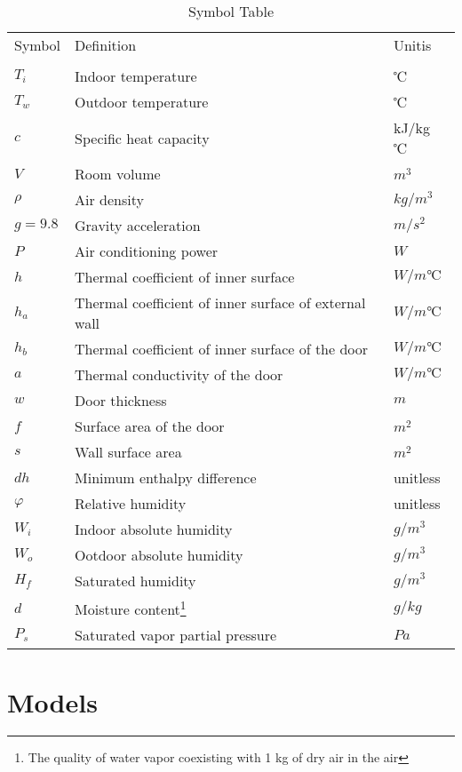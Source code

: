 \documentclass{mcmthesis}
\begin{document}
		\begin{table}
			\caption{Symbol Table}
			\centering
			\renewcommand\arraystretch{1.32}
			\begin{tabular}{l p{10cm} l}
				\hline
				Symbol & Definition & Unitis\\
				\noalign{\global\arrayrulewidth1pt}\hline\noalign{\global\arrayrulewidth0.9pt}
				\multicolumn{3}{c}{\textbf{Fundamental}}\\
				$T_i$ & Indoor temperature & ℃ \\
				$T_w$ & Outdoor temperature & ℃ \\
				$c$ & Specific heat capacity & kJ/kg ℃ \\
				$V$ & Room volume & $m^3$\\
				$\rho$ & Air density & $kg/m^3$\\
				$g=9.8$ & Gravity acceleration & $m/s^2$\\
				$P$ & Air conditioning power & $W$\\
				$h$ & Thermal coefficient of inner surface & $W/m ℃ $\\
				$h_a$ & Thermal coefficient of inner surface of external wall & $W/m ℃$\\
				$h_b$ & Thermal coefficient of inner surface of the door & $W/m ℃ $\\
				$a$ & Thermal conductivity of the door & $W/m ℃ $\\
				$w$ & Door thickness & $m$\\
				$f$ & Surface area of the door & $m^2$\\
				$s$ & Wall surface area & $m^2$\\
				$dh$ & Minimum enthalpy difference & unitless\\
				$\varphi$ & Relative humidity & unitless\\
				$W_i$ & Indoor absolute humidity & $g/m^3$\\
				$W_o$ & Ootdoor absolute humidity & $g/m^3$\\
				$H_f$ & Saturated humidity & $g/m^3$\\
				$d$ & Moisture content\footnote{The quality of water vapor coexisting with 1 kg of dry air in the air} & $g/kg$\\
				$P_s$ & Saturated vapor partial pressure & $Pa$\\
				
				
				\hline
			\end{tabular}
		\end{table}
			
	
	\section{Models}
	
\end{document}
